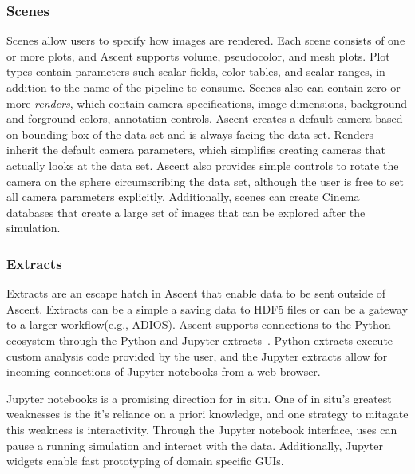 \subsubsection{Scenes}
Scenes allow users to specify how images are rendered.
%
Each scene consists of one or more plots, and Ascent supports volume,
pseudocolor, and mesh plots.
%
Plot types contain parameters such scalar fields, color tables, and scalar ranges,
in addition to the name of the pipeline to consume.
%
Scenes also can contain zero or more \textit{renders}, which contain
camera specifications, image dimensions, background and
forground colors, annotation controls.
%
Ascent creates a default camera based on bounding box of the data set and
is always facing the data set.
%
Renders inherit the default camera parameters, which simplifies creating
cameras that actually looks at the data set.
%
Ascent also provides simple controls to rotate the camera on the
sphere circumscribing the data set, although the user is free to set all
camera parameters explicitly.
%
Additionally, scenes can create Cinema~\cite{AhrensCinema} databases that
create a large set of images that can be explored after the simulation.

\subsubsection{Extracts}
Extracts are an escape hatch in Ascent that enable data to be sent
outside of Ascent.
%
Extracts can be a simple a saving data to HDF5 files or can be a gateway
to a larger workflow(e.g., ADIOS).
%
Ascent supports connections to the Python ecosystem through the Python and
Jupyter extracts~\cite{CyrusISAV}.
%
Python extracts execute custom analysis code provided by the user, and the
Jupyter extracts allow for incoming connections of Jupyter notebooks from a web
browser.
%

Jupyter notebooks is a promising direction for in situ.
%
One of in situ's greatest weaknesses is the it's reliance on a priori
knowledge, and one strategy to mitagate this weakness is interactivity.
%
Through the Jupyter notebook interface, uses can pause a running simulation
and interact with the data.
%
Additionally, Jupyter widgets enable fast prototyping of domain specific
GUIs.


